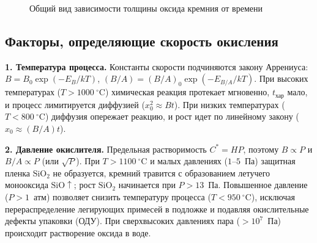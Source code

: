\documentclass[12pt,a4paper]{article}
\theoremstyle{plain}
\theoremstyle{definition}
\theoremstyle{remark}
\numberwithin{equation}{section}
\begin{document}
\begin{figure}[H]
    \centering
    \caption{Общий вид зависимости толщины оксида кремния от времени}
    \label{fig:deal_grove_kinetics}
\end{figure}

\subsection{Факторы, определяющие скорость окисления}

\textbf{1. Температура процесса.} Константы скорости подчиняются закону Аррениуса: $B = B_0 \exp(-E_B / kT)$, $(B/A) = (B/A)_0 \exp(-E_{B/A} / kT)$. При высоких температурах ($T > 1000~^\circ\mathrm{C}$) химическая реакция протекает мгновенно, $t_\text{хар}$ мало, и процесс лимитируется диффузией ($x_0^2 \approx Bt$). При низких температурах ($T < 800~^\circ\mathrm{C}$) диффузия опережает реакцию, и рост идет по линейному закону ($x_0 \approx (B/A)t$).

\textbf{2. Давление окислителя.} Предельная растворимость $C^* = HP$, поэтому $B \propto P$ и $B/A \propto P$ (или $\sqrt{P}$). При $T > 1100~^\circ\mathrm{C}$ и малых давлениях ($1\text{--}5$~Па) защитная пленка $\mathrm{SiO}_2$ не образуется, кремний травится с образованием летучего монооксида $\mathrm{SiO}\uparrow$; рост $\mathrm{SiO}_2$ начинается при $P > 13$~Па. Повышенное давление ($P > 1$~атм) позволяет снизить температуру процесса ($T < 950~^\circ\mathrm{C}$), исключая перераспределение легирующих примесей в подложке и подавляя окислительные дефекты упаковки (ОДУ). При сверхвысоких давлениях пара ($> 10^7$~Па) происходит растворение оксида в воде.
\end{document}
